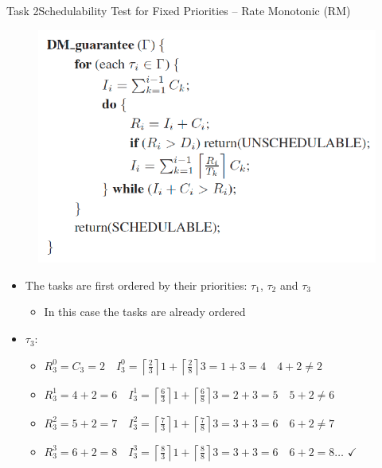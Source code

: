 \begin{frame}[allowframebreaks]{Task 2}{Schedulability Test for Fixed Priorities – Rate Monotonic (RM)}
\begin{requirementsnoinc}
\begin{figure}
      \includegraphics[height=0.5\paperheight]{./figures/2_algorithm.png}
    \end{figure}
  \end{requirementsnoinc}
  \begin{solutionnoinc}
    \begin{itemize}
      \item The tasks are first ordered by their priorities: $\tau_1$, $\tau_2$ and $\tau_3$
      \begin{itemize}
        \item In this case the tasks are already ordered
      \end{itemize}
      \item $\tau_3:$
      \begin{itemize}
        \item $R_3^0=C_3=2 \quad I_3^0=\left\lceil\frac{2}{3}\right\rceil 1+\left\lceil\frac{2}{8}\right\rceil 3=1+3=4 \quad 4+2 \neq 2$
        \item $R_3^1=4+2=6 \quad I_3^1=\left\lceil\frac{6}{3}\right\rceil 1+\left\lceil\frac{6}{8}\right\rceil 3=2+3=5 \quad 5+2 \neq 6$
        \item $R_3^2=5+2=7 \quad I_3^2=\left\lceil\frac{7}{3}\right\rceil 1+\left\lceil\frac{7}{8}\right\rceil 3=3+3=6 \quad 6+2 \neq 7$
        \item $R_3^3=6+2=8 \quad I_3^3=\left\lceil\frac{8}{3}\right\rceil 1+\left\lceil\frac{8}{8}\right\rceil 3=3+3=6 \quad 6+2=8 \ldots$ $\checkmark$


\end{itemize}
\end{itemize}
\end{solutionnoinc}
\end{frame}
